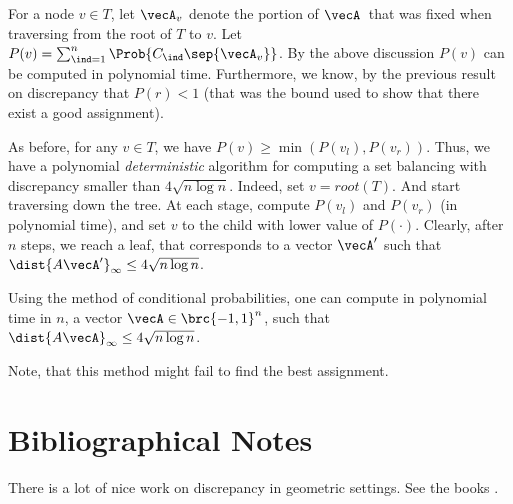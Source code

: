 For a node $v \in T$, let $\vecA_v$ denote the portion of $\vecA\,$
that was fixed when traversing from the root of $T$ to $v$.  Let
$P(v) = \sum_{\ind=1}^{n} \Prob{C_\ind \sep{\vecA_v}}$.  By the above
discussion $P(v)$ can be computed in polynomial time.  Furthermore, we
know, by the previous result on discrepancy that $P(r) < 1$ (that was
the bound used to show that there exist a good assignment).

As before, for any $v \in T$, we have $P(v) \geq \min(P(v_l),
P(v_r))$. Thus, we have a polynomial \emph{deterministic} algorithm
for computing a set balancing with discrepancy smaller than $4\sqrt{n
   \log{n}}$. Indeed, set $v = root(T)$. And start traversing down the
tree. At each stage, compute $P(v_l)$ and $P(v_r)$ (in polynomial
time), and set $v$ to the child with lower value of
$P(\cdot)$. Clearly, after $n$ steps, we reach a leaf, that
corresponds to a vector $\vecA'$ such that $\dist{A \vecA'}_{\infty}
\leq 4 \sqrt{n \log{n}}$.

\begin{theorem}
    Using the method of conditional probabilities, one can compute in
    polynomial time in $n$, a vector $\vecA \in \brc{-1,1}^n$, such
    that $\dist{A \vecA}_\infty \leq 4 \sqrt{n \log{n}}$.
\end{theorem}

Note, that this method might fail to find the best
assignment. 





\section{Bibliographical Notes}

There is a lot of nice work on discrepancy in geometric settings. See
the books \cite{c-dmr-01, m-gd-99}.




\ChapterEnd{}

 
